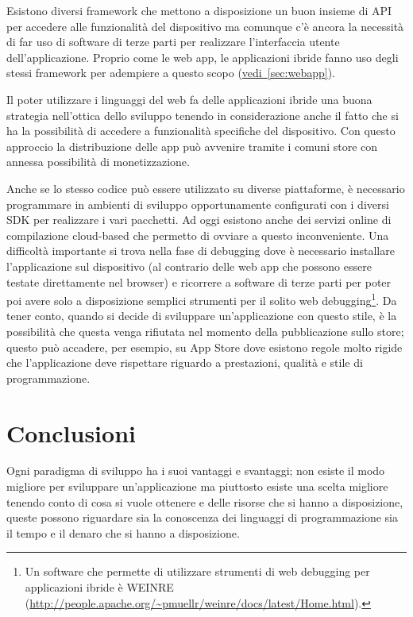         Esistono diversi framework che mettono a disposizione un buon insieme di
        API per accedere alle funzionalità del dispositivo ma comunque c'è
        ancora la necessità di far uso di software di terze parti per realizzare
        l'interfaccia utente dell'applicazione. Proprio come le web app, le
        applicazioni ibride fanno uso degli stessi framework per adempiere a
        questo scopo (\hyperref[sec:webapp]{vedi~\ref{sec:webapp}}).

        Il poter utilizzare i linguaggi del web fa delle applicazioni ibride una
        buona strategia nell'ottica dello sviluppo \crossplat{} tenendo in
        considerazione anche il fatto che si ha la possibilità di accedere a
        funzionalità specifiche del dispositivo. Con questo approccio la
        distribuzione delle app può avvenire tramite i comuni store con
        annessa possibilità di monetizzazione.

        Anche se lo stesso codice può essere utilizzato su diverse piattaforme,
        è necessario programmare in ambienti di sviluppo opportunamente
        configurati con i diversi SDK per realizzare i vari pacchetti. Ad oggi
        esistono anche dei servizi online di compilazione cloud-based che
        permetto di ovviare a questo inconveniente. Una difficoltà importante si
        trova nella fase di debugging dove è necessario installare
        l'applicazione sul dispositivo (al contrario delle web app che possono
        essere testate direttamente nel browser) e ricorrere a software di terze
        parti per poter poi avere solo a disposizione semplici strumenti per il
        solito web debugging\footnote{Un software che permette di utilizzare
        strumenti di web debugging per applicazioni ibride è WEINRE
        (\url{http://people.apache.org/~pmuellr/weinre/docs/latest/Home.html}).
        }. Da tener conto, quando si decide di sviluppare un'applicazione con
        questo stile, è la possibilità che questa venga rifiutata nel momento
        della pubblicazione sullo store; questo può accadere, per esempio, su
        App Store dove esistono regole molto rigide che l'applicazione deve
        rispettare riguardo a prestazioni, qualità e stile di programmazione.

    \section{Conclusioni}
        Ogni paradigma di sviluppo ha i suoi vantaggi e svantaggi; non esiste il
        modo migliore per sviluppare un'applicazione ma piuttosto esiste una
        scelta migliore tenendo conto di cosa si vuole ottenere e delle risorse
        che si hanno a disposizione, queste possono riguardare sia la
        conoscenza dei linguaggi di programmazione sia il tempo e il denaro che
        si hanno a disposizione.

